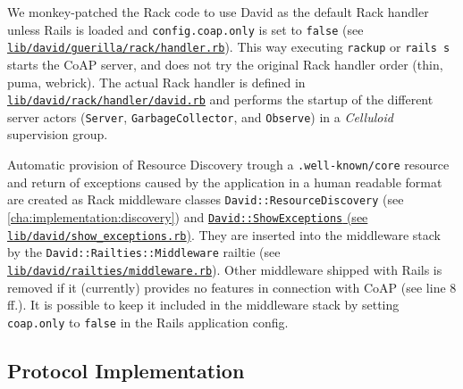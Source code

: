 		We monkey-patched the Rack code to use David as the default Rack
		handler unless Rails is loaded and \texttt{config.coap.only} is set to
		\texttt{false} (see
		\href{https://github.com/nning/david/blob/0.4.3/lib/david/guerilla/rack/handler.rb}{\texttt{lib/david/guerilla/rack/handler.rb}}).
		This way executing \texttt{rackup} or \texttt{rails s} starts the
		\ac{CoAP} server, and does not try the original Rack handler order
		(thin, puma, webrick). The actual Rack handler is defined in
		\href{https://github.com/nning/david/blob/0.4.3/lib/rack/handler/david.rb}{\texttt{lib/david/rack/handler/david.rb}}
		and performs the startup of the different server actors
		(\texttt{Server}, \texttt{GarbageCollector}, and \texttt{Observe}) in a
		\emph{Celluloid} supervision group.

		Automatic provision of Resource Discovery trough a
		\texttt{.well-known/core} resource and return of exceptions caused by
		the application in a human readable format are created as Rack
		middleware classes \texttt{David::ResourceDiscovery} (see
		\autoref{cha:implementation:discovery}) and
		\href{https://github.com/nning/david/blob/0.4.3/lib/david/show\_exceptions.rb}{\texttt{David::ShowExceptions}
		(see \texttt{lib/david/show\_exceptions.rb})}. They are inserted into
		the middleware stack by the \texttt{David::Railties::Middleware}
		railtie (see
		\href{https://github.com/nning/david/blob/0.4.3/lib/david/railties/middleware.rb}{\texttt{lib/david/railties/middleware.rb}}).
		Other middleware shipped with Rails is removed if it (currently)
		provides no features in connection with \ac{CoAP} (see line 8 ff.). It
		is possible to keep it included in the middleware stack by setting
		\texttt{coap.only} to \texttt{false} in the Rails application config.

	\subsection{Protocol Implementation}
	\label{cha:implementation:david:protocol}

